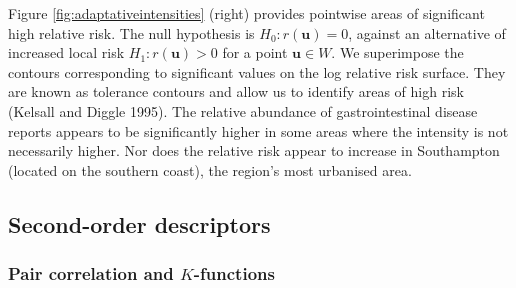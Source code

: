 Figure \ref{fig:adaptativeintensities} (right) provides pointwise areas of significant high relative risk. The null hypothesis is \(H_0: r(\mathbf{u})=0\), against an alternative of increased local risk \(H_1:r(\mathbf{u})>0\) for a point \(\mathbf{u}\in W\). We superimpose the contours corresponding to significant values on the log relative risk surface. They are known as tolerance contours and allow us to identify areas of high risk (Kelsall and Diggle 1995). The relative abundance of gastrointestinal disease reports appears to be significantly higher in some areas where the intensity is not necessarily higher. Nor does the relative risk appear to increase in Southampton (located on the southern coast), the region's most urbanised area.

\hypertarget{second-order-descriptors}{%
\subsection{Second-order descriptors}\label{second-order-descriptors}}

\hypertarget{pair-correlation-and-k-functions}{%
\subsubsection{\texorpdfstring{Pair correlation and \(K\)-functions}{Pair correlation and K-functions}}\label{pair-correlation-and-k-functions}}

